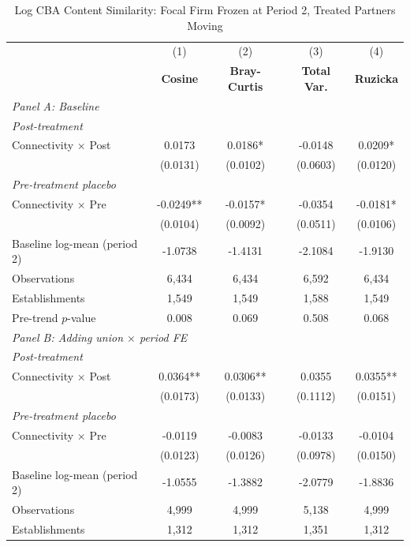 \begin{table}[H]
\centering
\caption{Log CBA Content Similarity: Focal Firm Frozen at Period 2, Treated Partners Moving}
\label{tab:focal_frozen_ln_cba_similarity}
\scriptsize
\setlength{\tabcolsep}{8pt}
\begin{tabular}{lcccc}
\hline\hline
 & (1) & (2) & (3) & (4) \\
 & \textbf{Cosine} & \textbf{Bray-Curtis} & \textbf{Total Var.} & \textbf{Ruzicka} \\
\hline
\multicolumn{5}{l}{\textit{Panel A: Baseline}} \\
\multicolumn{5}{l}{\textit{Post-treatment}} \\
Connectivity $\times$ Post & 0.0173 & 0.0186* & -0.0148 & 0.0209* \\
 & (0.0131) & (0.0102) & (0.0603) & (0.0120) \\
\multicolumn{5}{l}{\textit{Pre-treatment placebo}} \\
Connectivity $\times$ Pre & -0.0249** & -0.0157* & -0.0354 & -0.0181* \\
 & (0.0104) & (0.0092) & (0.0511) & (0.0106) \\
\hline
Baseline log-mean (period 2) & -1.0738 & -1.4131 & -2.1084 & -1.9130 \\
Observations &        6,434 &        6,434 &        6,592 &        6,434 \\
Establishments &        1,549 &        1,549 &        1,588 &        1,549 \\
Pre-trend $p$-value & 0.008 & 0.069 & 0.508 & 0.068 \\
\hline
\multicolumn{5}{l}{\textit{Panel B: Adding union $\times$ period FE}} \\
\multicolumn{5}{l}{\textit{Post-treatment}} \\
Connectivity $\times$ Post & 0.0364** & 0.0306** & 0.0355 & 0.0355** \\
 & (0.0173) & (0.0133) & (0.1112) & (0.0151) \\
\multicolumn{5}{l}{\textit{Pre-treatment placebo}} \\
Connectivity $\times$ Pre & -0.0119 & -0.0083 & -0.0133 & -0.0104 \\
 & (0.0123) & (0.0126) & (0.0978) & (0.0150) \\
\hline
Baseline log-mean (period 2) & -1.0555 & -1.3882 & -2.0779 & -1.8836 \\
Observations &        4,999 &        4,999 &        5,138 &        4,999 \\
Establishments &        1,312 &        1,312 &        1,351 &        1,312 \\

\end{tabular}
\end{table}
